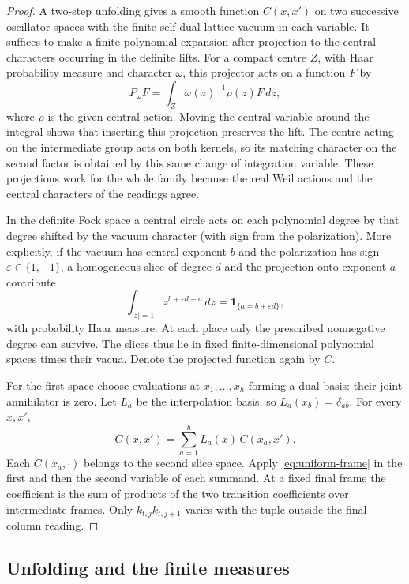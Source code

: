 \begin{proof}
A two-step unfolding gives a smooth function \(C(x,x')\) on
two successive oscillator spaces with the finite self-dual lattice
vacuum in each variable. It suffices to make a finite polynomial
expansion after projection to the central characters occurring in
the definite lifts. For a compact centre \(Z\), with Haar probability measure and
character \(\omega\), this projector acts on a function \(F\) by
\[
        P_\omega F=\int_Z\omega(z)^{-1}\rho(z)F\,dz ,
\]
where \(\rho\) is the given central action.
Moving the central variable around the integral shows that
inserting this projection preserves the lift. The centre acting
on the intermediate group acts on both kernels, so its matching
character on the second factor is obtained by this same change
of integration variable. These projections work for the whole
family because the real Weil actions and the central characters
of the readings agree.

In the definite Fock space a central circle
acts on each polynomial degree by that degree shifted by the
vacuum character (with sign from the polarization). More explicitly, if the vacuum has central exponent \(b\) and
the polarization has sign \(\varepsilon\in\{1,-1\}\), a homogeneous
slice of degree \(d\) and the projection onto exponent \(a\) contribute
\[
 \int_{|z|=1} z^{b+\varepsilon d-a}\,dz
   =\mathbf1_{\{a=b+\varepsilon d\}},
\]
with probability Haar measure. At each place only the prescribed
nonnegative degree can survive. The
slices thus lie in fixed finite-dimensional polynomial spaces
times their vacua. Denote the projected function again by \(C\).

For the first space choose evaluations at \(x_1,\ldots,x_h\)
forming a dual basis: their joint annihilator is zero. Let
\(L_a\) be the interpolation basis, so \(L_a(x_b)=\delta_{ab}\).
For every \(x,x'\),
\[
 C(x,x')=\sum_{a=1}^h L_a(x)\,C(x_a,x').
\]
Each \(C(x_a,\cdot)\) belongs to the second slice space.
Apply \eqref{eq:uniform-frame} in the first and then the second
variable of each summand. At a fixed final frame the coefficient
is the sum of products of the two transition coefficients over
intermediate frames. Only \(k_{t,j}k_{t,j+1}\) varies with the
tuple outside the final column reading.
\end{proof}

\subsection{Unfolding and the finite measures}

